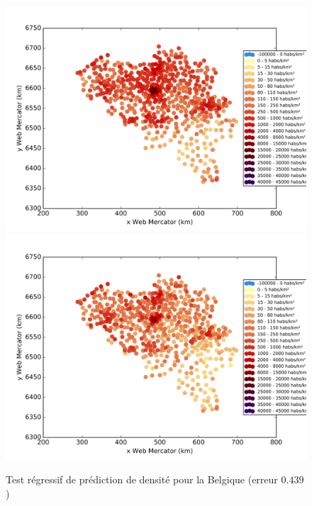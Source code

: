 \documentclass{book}
\begin{document}
\begin{figure}[H]
\begin{center}
\includegraphics[scale=0.5]{images/belgique_ground_truth.png}
\includegraphics[scale=0.5]{images/belgique_Random_Forest_Regression.png}
\end{center}
\caption{Test régressif de prédiction de densité pour la Belgique (erreur $0.439$)}
\label{test_belgique}
\end{figure}
\clearpage
\end{document}

